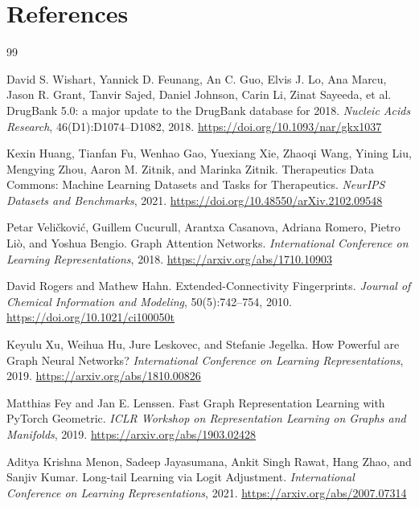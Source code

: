\documentclass[12pt,a4paper]{report}
\begin{document}
\chapter*{References}
\begin{thebibliography}{99}

David S. Wishart, Yannick D. Feunang, An C. Guo, Elvis J. Lo, Ana Marcu, Jason R. Grant, Tanvir Sajed, Daniel Johnson, Carin Li, Zinat Sayeeda, et al.
\newblock DrugBank 5.0: a major update to the DrugBank database for 2018.
\newblock \emph{Nucleic Acids Research}, 46(D1):D1074--D1082, 2018.
\newblock \url{https://doi.org/10.1093/nar/gkx1037}

Kexin Huang, Tianfan Fu, Wenhao Gao, Yuexiang Xie, Zhaoqi Wang, Yining Liu, Mengying Zhou, Aaron M. Zitnik, and Marinka Zitnik.
\newblock Therapeutics Data Commons: Machine Learning Datasets and Tasks for Therapeutics.
\newblock \emph{NeurIPS Datasets and Benchmarks}, 2021.
\newblock \url{https://doi.org/10.48550/arXiv.2102.09548}

Petar Veličković, Guillem Cucurull, Arantxa Casanova, Adriana Romero, Pietro Liò, and Yoshua Bengio.
\newblock Graph Attention Networks.
\newblock \emph{International Conference on Learning Representations}, 2018.
\newblock \url{https://arxiv.org/abs/1710.10903}

David Rogers and Mathew Hahn.
\newblock Extended-Connectivity Fingerprints.
\newblock \emph{Journal of Chemical Information and Modeling}, 50(5):742--754, 2010.
\newblock \url{https://doi.org/10.1021/ci100050t}

Keyulu Xu, Weihua Hu, Jure Leskovec, and Stefanie Jegelka.
\newblock How Powerful are Graph Neural Networks?
\newblock \emph{International Conference on Learning Representations}, 2019.
\newblock \url{https://arxiv.org/abs/1810.00826}

Matthias Fey and Jan E. Lenssen.
\newblock Fast Graph Representation Learning with PyTorch Geometric.
\newblock \emph{ICLR Workshop on Representation Learning on Graphs and Manifolds}, 2019.
\newblock \url{https://arxiv.org/abs/1903.02428}

Aditya Krishna Menon, Sadeep Jayasumana, Ankit Singh Rawat, Hang Zhao, and Sanjiv Kumar.
\newblock Long-tail Learning via Logit Adjustment.
\newblock \emph{International Conference on Learning Representations}, 2021.
\newblock \url{https://arxiv.org/abs/2007.07314}


\end{thebibliography}
\end{document}
